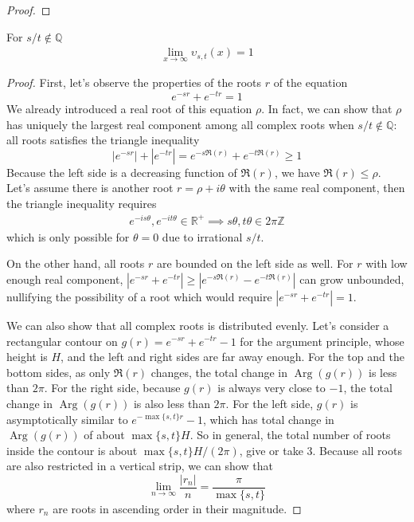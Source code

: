 \documentclass[]{article}
\DeclareMathOperator\Arg{Arg}
\begin{document}
\begin{proof}
\end{proof}

\vspace{1cm}
\begin{lemma}
	For $s/t\notin\mathbb{Q}$
	\begin{align*}
	\lim_{x\to\infty} \upsilon_{s,t}(x) = 1
	\end{align*}
\end{lemma}
\begin{proof}
First, let's observe the properties of the roots $r$ of the equation
\[
e^{-sr} + e^{-tr} = 1
\]
We already introduced a real root of this equation $\rho$. In fact, we can show that $\rho$ has uniquely the largest real component among all complex roots when $s/t\notin\mathbb{Q}$: all roots satisfies the triangle inequality
\[
|e^{-sr}| + |e^{-tr}| = e^{-s\Re(r)} + e^{-t\Re(r)} \ge 1
\]
Because the left side is a decreasing function of $\Re(r)$, we have $\Re(r) \le \rho$. Let's assume there is another root $r=\rho + i\theta$ with the same real component, then the triangle inequality requires
\begin{align*}
e^{-is\theta},e^{-it\theta}\in\mathbb{R^+}\implies  s\theta,t\theta\in2\pi\mathbb{Z}
\end{align*}
which is only possible for $\theta = 0$ due to irrational $s/t$.

On the other hand, all roots $r$ are bounded on the left side as well. For $r$ with low enough real component, $|e^{-sr} + e^{-tr}| \ge |e^{-s\Re(r)} - e^{-t\Re(r)}|$ can grow unbounded, nullifying the possibility of a root which would require  $|e^{-sr} + e^{-tr}|=1$.

We can also show that all complex roots is distributed evenly. Let's consider a rectangular contour on $g(r) = e^{-sr} + e^{-tr} - 1$ for the argument principle, whose height is $H$, and the left and right sides are far away enough. For the top and the bottom sides, as only $\Re(r)$ changes, the total change in $\Arg(g(r))$ is less than $2\pi$. For the right side, because $g(r)$ is always very close to $-1$, the total change in $\Arg(g(r))$ is also less than $2\pi$. For the left side, $g(r)$ is asymptotically similar to $e^{-\max\{s,t\}r}-1$, which has total change in $\Arg(g(r))$ of about $\max\{s,t\}H$. So in general, the total number of roots inside the contour is about $\max\{s,t\}H/(2\pi)$, give or take 3. Because all roots are also restricted in a vertical strip, we can show that
\[
\lim_{n\to\infty}\frac{|r_n|}{n} = \frac{\pi}{\max\{s,t\}}
\]
where $r_n$ are roots in ascending order in their magnitude.


\end{proof}
\end{document}
